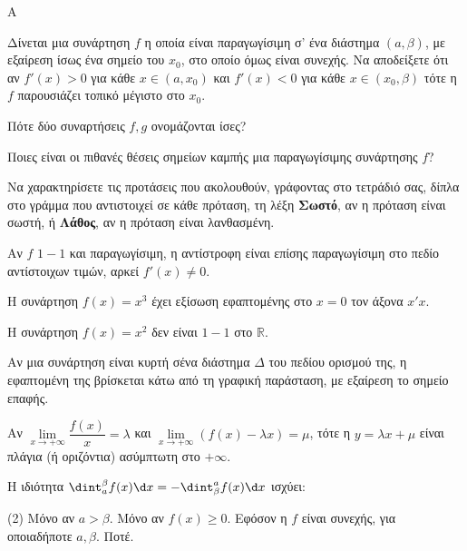 \begin{thema}{A}
\begin{erwthma}
    \item Δίνεται μια συνάρτηση $ f $ η οποία είναι παραγωγίσιμη σ’ ένα διάστημα $ (a,\beta) $, με εξαίρεση ίσως ένα σημείο του $ x_0 $, στο οποίο όμως είναι συνεχής. Να αποδείξετε ότι αν $ f'(x)>0 $ για κάθε $ x\in(a,x_0) $ και $ f'(x)<0 $ για κάθε $ x\in(x_0,\beta) $ τότε η $ f $ παρουσιάζει τοπικό μέγιστο στο $ x_0 $. 
    \item Πότε δύο συναρτήσεις $f, g$ ονομάζονται ίσες?
    \item Ποιες είναι οι πιθανές θέσεις σημείων καμπής μια παραγωγίσιμης συνάρτησης $f$?
    \item Να χαρακτηρίσετε τις προτάσεις που ακολουθούν, γράφοντας στο τετράδιό σας, δίπλα στο γράμμα που αντιστοιχεί σε κάθε πρόταση, τη λέξη \textbf{Σωστό}, αν η πρόταση είναι σωστή, ή \textbf{Λάθος}, αν η πρόταση είναι λανθασμένη.
    \begin{alist}
        \item Αν $f$ $1-1$ και παραγωγίσιμη, η αντίστροφη είναι επίσης παραγωγίσιμη στο πεδίο αντίστοιχων τιμών, αρκεί $f'(x) \ne 0$.
        \item Η συνάρτηση $f(x)=x^3$ έχει εξίσωση εφαπτομένης στο $x=0$ τον άξονα $x'x$.
        \item H συνάρτηση $f(x)=x^2$ δεν είναι $1-1$ στο $\mathbb{R}$.
        \item Αν μια συνάρτηση είναι κυρτή σένα διάστημα $\Delta$ του πεδίου ορισμού της, η εφαπτομένη της βρίσκεται κάτω από τη γραφική παράσταση, με εξαίρεση το σημείο επαφής.
        \item Αν $\lim\limits_{x \to +\infty} \dfrac{f(x)}{x} = \lambda$ και $\lim\limits_{x \to +\infty} (f(x)-\lambda x) = \mu$, τότε η $y=\lambda x + \mu$ είναι πλάγια (ή οριζόντια) ασύμπτωτη στο $+\infty$.
    \end{alist}
    \item Η ιδιότητα $\dint_a^\beta f(x) \d x = - \dint_\beta^a f(x) \d x$ ισχύει:
    \begin{tasks}[label=\let\textdexiakeraia\relax\alph*.](2)
        \task Μόνο αν $a > \beta$.
        \task Μόνο αν $f(x) \ge 0$.
        \task Εφόσον η $f$ είναι συνεχής, για οποιαδήποτε $a, \beta$.
        \task Ποτέ.
    \end{tasks}
\end{erwthma}
\end{thema}


